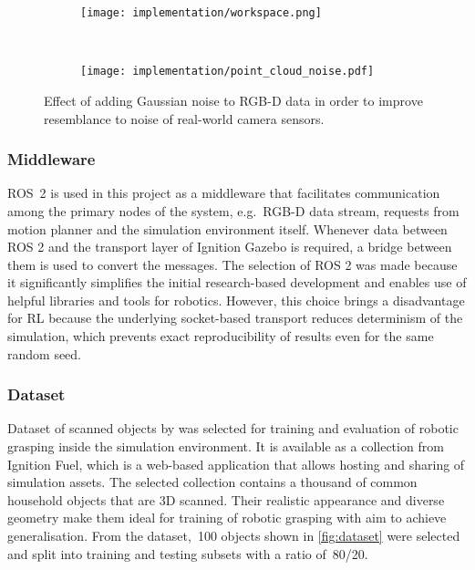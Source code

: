 \begin{figure}[ht]
    \centering
    \begin{subfigure}[ht]{0.325\textwidth}
        \begin{flushleft}%
            \texttt{[image: implementation/workspace.png]}
        \end{flushleft}%
    \end{subfigure}%
    ~\vrule~%
    \begin{subfigure}[ht]{0.65\textwidth}
        \begin{flushright}%
            \texttt{[image: implementation/point\_cloud\_noise.pdf]}
        \end{flushright}%
    \end{subfigure}%
    \caption{Effect of adding Gaussian noise to RGB-D data in order to improve resemblance to noise of real-world camera sensors.}
    \label{fig:point_cloud_noise}
\end{figure}


\subsubsection{Middleware}

ROS~2 is used in this project as a middleware that facilitates communication among the primary nodes of the system, e.g.~RGB-D data stream, requests from motion planner and the simulation environment itself. Whenever data between ROS 2 and the transport layer of Ignition Gazebo is required, a bridge between them is used to convert the messages. The selection of ROS 2 was made because it significantly simplifies the initial research-based development and enables use of helpful libraries and tools for robotics. However, this choice brings a disadvantage for RL because the underlying socket-based transport reduces determinism of the simulation, which prevents exact reproducibility of results even for the same random seed.


\subsubsection{Dataset}

Dataset of scanned objects by \citet{googleresearch_google_2020} was selected for training and evaluation of robotic grasping inside the simulation environment. It is available as a collection from Ignition Fuel, which is a web-based application that allows hosting and sharing of simulation assets. The selected collection contains a thousand of common household objects that are 3D scanned. Their realistic appearance and diverse geometry make them ideal for training of robotic grasping with aim to achieve generalisation. From the dataset,~100 objects shown in \autoref{fig:dataset} were selected and split into training and testing subsets with a ratio of~80/20.

